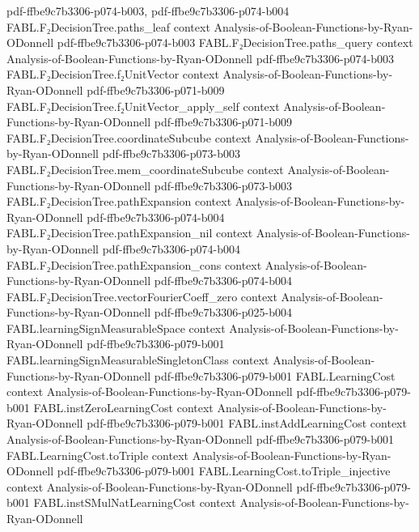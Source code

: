 \begin{theorem}
  {pdf-ffbe9c7b3306-p074-b003,
    pdf-ffbe9c7b3306-p074-b004}
\proofstep
  {FABL.F₂DecisionTree.paths_leaf}
  {context}
  {Analysis-of-Boolean-Functions-by-Ryan-ODonnell}
  {pdf-ffbe9c7b3306-p074-b003}
\proofstep
  {FABL.F₂DecisionTree.paths_query}
  {context}
  {Analysis-of-Boolean-Functions-by-Ryan-ODonnell}
  {pdf-ffbe9c7b3306-p074-b003}
\proofstep
  {FABL.F₂DecisionTree.f₂UnitVector}
  {context}
  {Analysis-of-Boolean-Functions-by-Ryan-ODonnell}
  {pdf-ffbe9c7b3306-p071-b009}
\proofstep
  {FABL.F₂DecisionTree.f₂UnitVector_apply_self}
  {context}
  {Analysis-of-Boolean-Functions-by-Ryan-ODonnell}
  {pdf-ffbe9c7b3306-p071-b009}
\proofstep
  {FABL.F₂DecisionTree.coordinateSubcube}
  {context}
  {Analysis-of-Boolean-Functions-by-Ryan-ODonnell}
  {pdf-ffbe9c7b3306-p073-b003}
\proofstep
  {FABL.F₂DecisionTree.mem_coordinateSubcube}
  {context}
  {Analysis-of-Boolean-Functions-by-Ryan-ODonnell}
  {pdf-ffbe9c7b3306-p073-b003}
\proofstep
  {FABL.F₂DecisionTree.pathExpansion}
  {context}
  {Analysis-of-Boolean-Functions-by-Ryan-ODonnell}
  {pdf-ffbe9c7b3306-p074-b004}
\proofstep
  {FABL.F₂DecisionTree.pathExpansion_nil}
  {context}
  {Analysis-of-Boolean-Functions-by-Ryan-ODonnell}
  {pdf-ffbe9c7b3306-p074-b004}
\proofstep
  {FABL.F₂DecisionTree.pathExpansion_cons}
  {context}
  {Analysis-of-Boolean-Functions-by-Ryan-ODonnell}
  {pdf-ffbe9c7b3306-p074-b004}
\proofstep
  {FABL.F₂DecisionTree.vectorFourierCoeff_zero}
  {context}
  {Analysis-of-Boolean-Functions-by-Ryan-ODonnell}
  {pdf-ffbe9c7b3306-p025-b004}
\proofstep
  {FABL.learningSignMeasurableSpace}
  {context}
  {Analysis-of-Boolean-Functions-by-Ryan-ODonnell}
  {pdf-ffbe9c7b3306-p079-b001}
\proofstep
  {FABL.learningSignMeasurableSingletonClass}
  {context}
  {Analysis-of-Boolean-Functions-by-Ryan-ODonnell}
  {pdf-ffbe9c7b3306-p079-b001}
\proofstep
  {FABL.LearningCost}
  {context}
  {Analysis-of-Boolean-Functions-by-Ryan-ODonnell}
  {pdf-ffbe9c7b3306-p079-b001}
\proofstep
  {FABL.instZeroLearningCost}
  {context}
  {Analysis-of-Boolean-Functions-by-Ryan-ODonnell}
  {pdf-ffbe9c7b3306-p079-b001}
\proofstep
  {FABL.instAddLearningCost}
  {context}
  {Analysis-of-Boolean-Functions-by-Ryan-ODonnell}
  {pdf-ffbe9c7b3306-p079-b001}
\proofstep
  {FABL.LearningCost.toTriple}
  {context}
  {Analysis-of-Boolean-Functions-by-Ryan-ODonnell}
  {pdf-ffbe9c7b3306-p079-b001}
\proofstep
  {FABL.LearningCost.toTriple_injective}
  {context}
  {Analysis-of-Boolean-Functions-by-Ryan-ODonnell}
  {pdf-ffbe9c7b3306-p079-b001}
\proofstep
  {FABL.instSMulNatLearningCost}
  {context}
  {Analysis-of-Boolean-Functions-by-Ryan-ODonnell}

\end{theorem}
